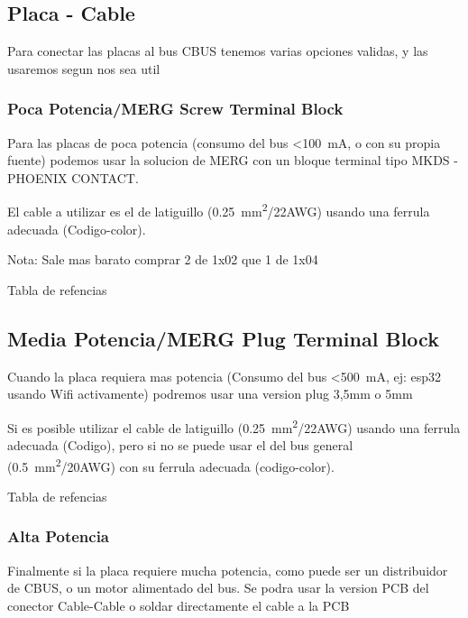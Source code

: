 
\subsection{Placa - Cable}
Para conectar las placas al bus CBUS tenemos varias opciones validas, y las usaremos segun nos sea util

\subsubsection{Poca Potencia/MERG Screw Terminal Block}
Para las placas de poca potencia (consumo del bus <\SI{100}{\milli\ampere}, o con su propia fuente) podemos usar la solucion de MERG con un bloque terminal tipo MKDS - PHOENIX CONTACT.

El cable a utilizar es el de latiguillo (\SI{0,25}{\milli\metre\squared}/22AWG) usando una ferrula adecuada (Codigo-color). 

\begin{mdframed}
Nota: Sale mas barato comprar 2 de 1x02 que 1 de 1x04 
\end{mdframed}

Tabla de refencias 

\subsection{Media Potencia/MERG Plug Terminal Block}
Cuando la placa requiera mas potencia (Consumo del bus <\SI{500}{\milli\ampere}, ej: esp32 usando Wifi activamente)  podremos usar una version plug 3,5mm o 5mm

Si es posible utilizar el cable de latiguillo (\SI{0,25}{\milli\metre\squared}/22AWG) usando una ferrula adecuada (Codigo), pero si no se puede usar el del bus general
(\SI{0,5}{\milli\metre\squared}/20AWG) con su ferrula adecuada (codigo-color). 

Tabla de refencias 
\subsubsection{Alta Potencia}
Finalmente si la placa requiere mucha potencia, como puede ser un distribuidor de CBUS, o un motor alimentado del bus. Se podra usar la version PCB del conector Cable-Cable o soldar directamente el cable a la PCB
